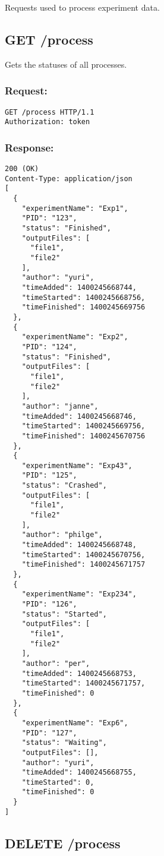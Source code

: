 Requests used to process experiment data.

\subsection*{GET /process}

Gets the statuses of all processes.

\subsubsection*{Request:}
\begin{verbatim}
GET /process HTTP/1.1
Authorization: token
\end{verbatim}

\subsubsection*{Response:}
\begin{verbatim}
200 (OK)
Content-Type: application/json
[
  {
    "experimentName": "Exp1",
    "PID": "123",
    "status": "Finished",
    "outputFiles": [
      "file1",
      "file2"
    ],
    "author": "yuri",
    "timeAdded": 1400245668744,
    "timeStarted": 1400245668756,
    "timeFinished": 1400245669756
  },
  {
    "experimentName": "Exp2",
    "PID": "124",
    "status": "Finished",
    "outputFiles": [
      "file1",
      "file2"
    ],
    "author": "janne",
    "timeAdded": 1400245668746,
    "timeStarted": 1400245669756,
    "timeFinished": 1400245670756
  },
  {
    "experimentName": "Exp43",
    "PID": "125",
    "status": "Crashed",
    "outputFiles": [
      "file1",
      "file2"
    ],
    "author": "philge",
    "timeAdded": 1400245668748,
    "timeStarted": 1400245670756,
    "timeFinished": 1400245671757
  },
  {
    "experimentName": "Exp234",
    "PID": "126",
    "status": "Started",
    "outputFiles": [
      "file1",
      "file2"
    ],
    "author": "per",
    "timeAdded": 1400245668753,
    "timeStarted": 1400245671757,
    "timeFinished": 0
  },
  {
    "experimentName": "Exp6",
    "PID": "127",
    "status": "Waiting",
    "outputFiles": [],
    "author": "yuri",
    "timeAdded": 1400245668755,
    "timeStarted": 0,
    "timeFinished": 0
  }
]
\end{verbatim}

\subsection*{DELETE /process}

